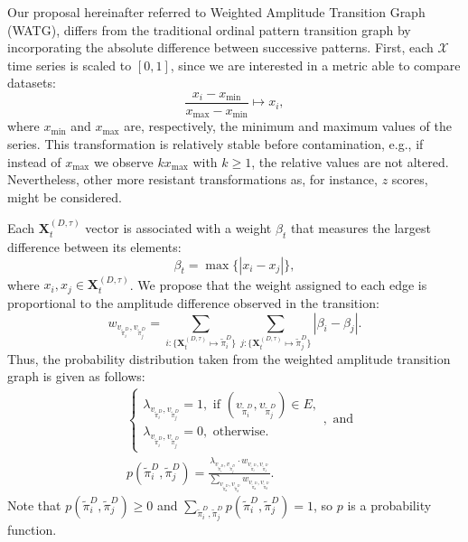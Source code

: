 \documentclass[a4,11pt]{pssbmac}
\begin{document}
Our proposal hereinafter referred to  Weighted Amplitude Transition Graph (WATG), differs from the traditional ordinal pattern transition graph by incorporating the absolute difference between successive patterns. 
First, each $\mathcal{X}$ time series is scaled to $[0, 1]$, since we are interested in a metric able to compare datasets:
\begin{equation}
\frac{x_i - x_{\min}}{x_{\max} - x_{\min}} \longmapsto x_i,
\label{eq:scaling}
\end{equation}
where $x_{\min}$ and $x_{\max}$ are, respectively, the minimum and maximum values of the series.
This transformation is relatively stable before contamination, e.g., if instead of $x_{\max}$ we observe $k x_{\max}$ with $k\geq 1$, the relative values are not altered. 
Nevertheless, other more resistant transformations as, for instance, $z$ scores, might be considered.

Each $\mathbf{X}^{(D, \tau)}_t$ vector is associated with a weight $\beta_t$ that measures the largest difference between its elements:
\begin{equation}
\beta_t = \max\{|x_i - x_j|\},
\end{equation}
where $x_i, x_j \in \mathbf{X}^{(D, \tau)}_t$.
We propose that the weight assigned to each edge is proportional to the amplitude difference observed in the transition:	
\begin{equation}
w_{v_{\widetilde \pi^D_i}, v_{\widetilde \pi^D_j}} =  \sum_{i : \{\mathbf{X}^{(D,\tau)}_t \mapsto \widetilde\pi^D_i\}} \sum_{j : \{\mathbf{X}^{(D,\tau)}_t \mapsto \widetilde\pi^D_j\}} |\beta_i - \beta_j| .
\end{equation}
Thus, the probability distribution taken from the weighted amplitude transition graph is given as follows:	
\begin{align}
&\left\{\begin{array}{l}
\lambda_{v_{\widetilde\pi^D_i}, v_{\widetilde\pi^D_j}} = 1, \text{ if } (v_{\widetilde\pi^D_i}, v_{\widetilde\pi^D_j}) \in {E}, \\
\lambda_{v_{\widetilde\pi^D_i}, v_{\widetilde\pi^D_j}} = 0, \text{ otherwise}.
\end{array}\right., \text{ and} \\
&p(\widetilde\pi^D_i, \widetilde\pi^D_j) = \frac{\lambda_{v_{\widetilde\pi^D_i}, v_{\widetilde\pi^D_j}} \cdot w_{v_{\widetilde\pi^D_i}, v_{\widetilde\pi^D_j}}}{\sum_{v_{\widetilde\pi^D_a}, v_{\widetilde\pi^D_b}} w_{v_{\widetilde\pi^D_a}, v_{\widetilde\pi^D_b}}}.
\end{align}
Note that  $p(\widetilde\pi^D_i, \widetilde\pi^D_j) \ge 0$ and $\sum_{\widetilde\pi^D_i, \widetilde\pi^D_j} p(\widetilde\pi^D_i, \widetilde\pi^D_j) = 1$, so $p$ is a probability function.
\end{document}
